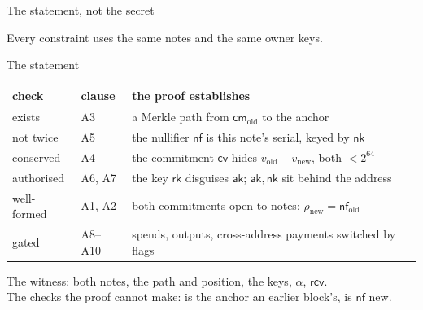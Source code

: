 \documentclass[aspectratio=169,11pt]{beamer}
\newcommand{\nfsym}{\ensuremath{\mathsf{nf}}}
\newcommand{\cmsym}{\ensuremath{\mathsf{cm}}}
\newcommand{\cmx}{\ensuremath{\mathsf{cmx}}}
\newcommand{\cvsym}{\ensuremath{\mathsf{cv}}}
\newcommand{\rksym}{\ensuremath{\mathsf{rk}}}
\newcommand{\aksym}{\ensuremath{\mathsf{ak}}}
\newcommand{\nksym}{\ensuremath{\mathsf{nk}}}
\newcommand{\rcv}{\ensuremath{\mathsf{rcv}}}
\begin{document}
\begin{frame}{The statement, not the secret}
\begin{center}
\end{center}
\vfill
Every constraint uses the same notes and the same owner keys.
\end{frame}

\begin{frame}{The statement}
\begin{center}
\begin{tabular}{@{}ll>{\raggedright\arraybackslash}p{}@{}}
\toprule
check & clause & the proof establishes \\
\midrule
exists & A3 & a Merkle path from $\cmsym_{\mathrm{old}}$ to the anchor \\
not twice & A5 & the nullifier $\nfsym$ is this note's serial, keyed by $\nksym$ \\
conserved & A4 & the commitment $\cvsym$ hides $v_{\mathrm{old}} - v_{\mathrm{new}}$, both $< 2^{64}$ \\
authorised & A6, A7 & the key $\rksym$ disguises $\aksym$; $\aksym, \nksym$ sit behind the address \\
\addlinespace
well-formed & A1, A2 & both commitments open to notes; $\rho_{\mathrm{new}} = \nfsym_{\mathrm{old}}$ \\
gated & A8--A10 & spends, outputs, cross-address payments switched by flags \\
\bottomrule
\end{tabular}
\end{center}
\vfill
The witness: both notes, the path and position, the keys, $\alpha$, $\rcv$.\\
The checks the proof cannot make: is the anchor an earlier block's, is $\nfsym$ new.
\end{frame}
\end{document}
